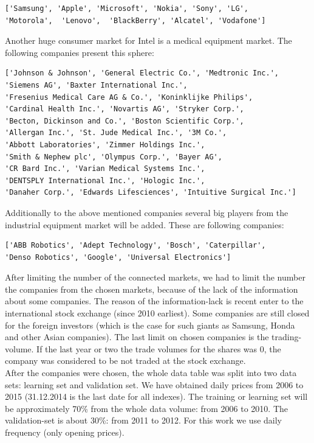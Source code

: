 \documentclass{article}
\begin{document}
\begin{verbatim}
['Samsung', 'Apple', 'Microsoft', 'Nokia', 'Sony', 'LG',
'Motorola',  'Lenovo',  'BlackBerry', 'Alcatel', 'Vodafone']
\end{verbatim} 
Another huge consumer market for Intel is a medical equipment market. The following companies present this sphere:
\begin{verbatim}
['Johnson & Johnson', 'General Electric Co.', 'Medtronic Inc.',
'Siemens AG', 'Baxter International Inc.', 
'Fresenius Medical Care AG & Co.', 'Koninklijke Philips',
'Cardinal Health Inc.', 'Novartis AG', 'Stryker Corp.',
'Becton, Dickinson and Co.', 'Boston Scientific Corp.',
'Allergan Inc.', 'St. Jude Medical Inc.', '3M Co.',
'Abbott Laboratories', 'Zimmer Holdings Inc.', 
'Smith & Nephew plc', 'Olympus Corp.', 'Bayer AG',
'CR Bard Inc.', 'Varian Medical Systems Inc.',
'DENTSPLY International Inc.', 'Hologic Inc.', 
'Danaher Corp.', 'Edwards Lifesciences', 'Intuitive Surgical Inc.']
\end{verbatim}
Additionally to the above mentioned companies several big players from the industrial equipment market will be added. These are following companies:
\begin{verbatim}
['ABB Robotics', 'Adept Technology', 'Bosch', 'Caterpillar',
'Denso Robotics', 'Google', 'Universal Electronics']
\end{verbatim}
After limiting the number of the connected markets, we had to limit the number the companies from the chosen markets, because of the lack of the information about some companies. The reason of the information-lack is recent enter to the international stock exchange (since 2010 earliest). Some companies are still closed for the foreign investors (which is the case for such giants as Samsung, Honda and other Asian companies). The last limit on chosen companies is the trading-volume. If the last year or two the trade volumes for the shares was 0, the company was considered to be not traded at the stock exchange.\\
After the companies were chosen, the whole data table was split into two data sets: learning set and validation set. We have obtained daily prices from 2006 to 2015 (31.12.2014 is the last date for all indexes). The training or learning set will be approximately 70\% from the whole data volume: from 2006 to 2010. The validation-set is about 30\%: from 2011 to 2012. For this work we use daily frequency (only opening prices).\\

\newpage
\end{document}

